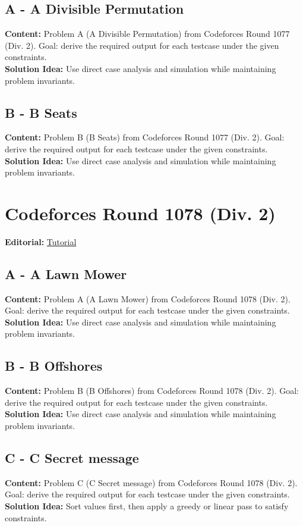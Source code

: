 \documentclass[11pt]{article}
\begin{document}
\subsection{A - A Divisible Permutation}
\textbf{Content:} Problem A (A Divisible Permutation) from Codeforces Round 1077 (Div. 2). Goal: derive the required output for each testcase under the given constraints.\\
\textbf{Solution Idea:} Use direct case analysis and simulation while maintaining problem invariants.

\subsection{B - B Seats}
\textbf{Content:} Problem B (B Seats) from Codeforces Round 1077 (Div. 2). Goal: derive the required output for each testcase under the given constraints.\\
\textbf{Solution Idea:} Use direct case analysis and simulation while maintaining problem invariants.

\section{Codeforces Round 1078 (Div. 2)}
\textbf{Editorial:} \href{https://codeforces.com/blog/entry/150940}{Tutorial}

\subsection{A - A Lawn Mower}
\textbf{Content:} Problem A (A Lawn Mower) from Codeforces Round 1078 (Div. 2). Goal: derive the required output for each testcase under the given constraints.\\
\textbf{Solution Idea:} Use direct case analysis and simulation while maintaining problem invariants.

\subsection{B - B Offshores}
\textbf{Content:} Problem B (B Offshores) from Codeforces Round 1078 (Div. 2). Goal: derive the required output for each testcase under the given constraints.\\
\textbf{Solution Idea:} Use direct case analysis and simulation while maintaining problem invariants.

\subsection{C - C Secret message}
\textbf{Content:} Problem C (C Secret message) from Codeforces Round 1078 (Div. 2). Goal: derive the required output for each testcase under the given constraints.\\
\textbf{Solution Idea:} Sort values first, then apply a greedy or linear pass to satisfy constraints.
\end{document}

